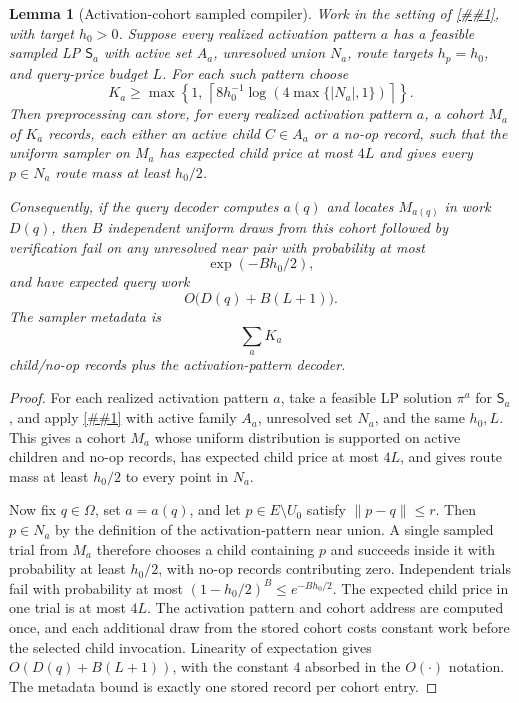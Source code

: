 \documentclass[10pt]{article}
\newcommand{\cref}[1]{\ref{##1}}
\newtheorem{lemma}[theorem]{Lemma}
\theoremstyle{definition}
\begin{document}
\begin{lemma}[Activation-cohort sampled compiler]
   \label{lem:activation-cohort-sampled-compiler}
   Work in the setting of
   \cref{lem:activation-sampled-route-verifier}, with target \(h_0>0\).
   Suppose every realized activation pattern \(a\) has a feasible sampled LP
   \(\mathsf S_a\) with active set \(A_a\), unresolved union \(N_a\), route
   targets \(h_p=h_0\), and query-price budget \(L\).  For each such pattern
   choose
   \[
      K_a\ge
      \max\left\{
         1,\,
         \left\lceil 8h_0^{-1}\log(4\max\{|N_a|,1\})\right\rceil
      \right\}.
   \]
   Then preprocessing can store, for every realized activation pattern \(a\),
   a cohort \(M_a\) of \(K_a\) records, each either an active child
   \(C\in A_a\) or a no-op record, such that the uniform sampler on \(M_a\)
   has expected child price at most \(4L\) and gives every
   \(p\in N_a\) route mass at least \(h_0/2\).

   Consequently, if the query decoder computes \(a(q)\) and locates
   \(M_{a(q)}\) in work \(D(q)\), then \(B\) independent uniform draws from
   this cohort followed by verification fail on any unresolved near pair with
   probability at most
   \[
      \exp(-Bh_0/2),
   \]
   and have expected query work
   \[
      O\bigl(D(q)+B(L+1)\bigr).
   \]
   The sampler metadata is
   \[
      \sum_{a}K_a
   \]
   child/no-op records plus the activation-pattern decoder.
\end{lemma}

\begin{proof}
   For each realized activation pattern \(a\), take a feasible LP solution
   \(\pi^a\) for \(\mathsf S_a\), and apply
   \cref{lem:sampled-route-cohort} with active family \(A_a\), unresolved set
   \(N_a\), and the same \(h_0,L\).  This gives a cohort \(M_a\) whose uniform
   distribution is supported on active children and no-op records, has expected
   child price at most \(4L\), and gives route mass at least \(h_0/2\) to every
   point in \(N_a\).

   Now fix \(q\in\Omega\), set \(a=a(q)\), and let
   \(p\in E\setminus U_0\) satisfy \(\|p-q\|\le r\).  Then \(p\in N_a\) by the
   definition of the activation-pattern near union.  A single sampled trial
   from \(M_a\) therefore chooses a child containing \(p\) and succeeds inside
   it with probability at least \(h_0/2\), with no-op records contributing
   zero.  Independent trials fail with probability at most
   \((1-h_0/2)^B\le e^{-Bh_0/2}\).  The expected child price in one trial is at
   most \(4L\).  The activation pattern and cohort address are computed once,
   and each additional draw from the stored cohort costs constant work before
   the selected child invocation.  Linearity of expectation gives
   \(O(D(q)+B(L+1))\), with the constant \(4\) absorbed in the
   \(O(\cdot)\) notation.  The metadata bound is exactly one stored record per
   cohort entry.
\end{proof}
\end{document}
